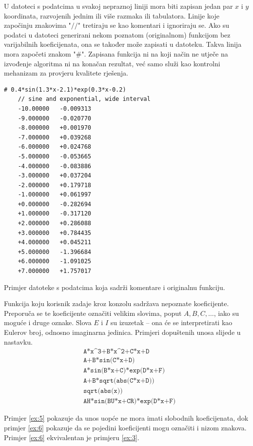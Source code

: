 \documentclass[times, utf8, seminar, numeric]{fer}
\begin{document}
U datoteci s podatcima u svakoj nepraznoj liniji mora biti zapisan jedan par $x$ i $y$ koordinata, razvojenih jednim ili više razmaka ili tabulatora.
Linije koje započinju znakovima "$//$" tretiraju se kao komentari i ignoriraju se.
Ako su podatci u datoteci generirani nekom poznatom (originalnom) funkcijom bez varijabilnih koeficijenata, ona se također može zapisati u datoteku.
Takva linija mora započeti znakom "$\#$".
Zapisana funkcija ni na koji način ne utječe na izvođenje algoritma ni na konačan rezultat, već samo služi kao kontrolni mehanizam za provjeru kvalitete rješenja.

\begin{datoteka}
	\begin{Verbatim}[fontsize=\small]
	# 0.4*sin(1.3*x-2.1)*exp(0.3*x-0.2)
	// sine and exponential, wide interval
	-10.00000	-0.009313
	-9.000000	-0.020770
	-8.000000	+0.001970
	-7.000000	+0.039268
	-6.000000	+0.024768
	-5.000000	-0.053665
	-4.000000	-0.083886
	-3.000000	+0.037204
	-2.000000	+0.179718
	-1.000000	+0.061997
	+0.000000	-0.282694
	+1.000000	-0.317120
	+2.000000	+0.286088
	+3.000000	+0.784435
	+4.000000	+0.045211
	+5.000000	-1.396684
	+6.000000	-1.091025
	+7.000000	+1.757017
	\end{Verbatim}
	\caption[Sadržaj datoteke s podatcima]
	{\label{PrimjerDatoteke}Primjer datoteke s podatcima koja sadrži komentare i originalnu funkciju.}
\end{datoteka}

Funkcija koju korisnik zadaje kroz konzolu sadržava nepoznate koeficijente.
Preporuča se te koeficijente označiti velikim slovima, poput $A, B, C, \dots$, iako su moguće i druge oznake.
Slova $E$ i $I$ su izuzetak -- ona će se interpretirati kao Eulerov broj, odnosno imaginarna jedinica.
Primjeri dopuštenih unosa slijede u nastavku.
\begin{align}
	&\texttt{A*x\textasciicircum 3+B*x\textasciicircum 2+C*x+D} \label{ex:1}\\
	&\texttt{A+B*sin(C*x+D)} \label{ex:2}\\
	&\texttt{A*sin(B*x+C)*exp(D*x+F)} \label{ex:3}\\
	&\texttt{A+B*sqrt(abs(C*x+D))} \label{ex:4}\\
	&\texttt{sqrt(abs(x))} \label{ex:5}\\
	&\texttt{AH*sin(BU*x+CR)*exp(D*x+F)} \label{ex:6}
\end{align}

Primjer \ref{ex:5} pokazuje da unos uopće ne mora imati slobodnih koeficijenata, dok primjer \ref{ex:6} pokazuje da se pojedini koeficijenti mogu označiti i nizom znakova.
Primjer \ref{ex:6} ekvivalentan je primjeru \ref{ex:3}.
\end{document}
